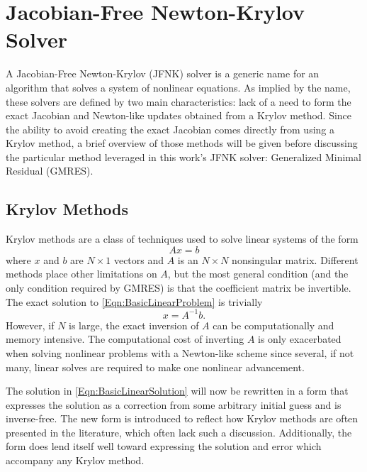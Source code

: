 \documentclass[Prelim,12pt]{WisconsinThesis}
\newcommand{\by}    {\!\times\!}
\begin{document}
\chapter[JFNK Solver]{Jacobian-Free Newton-Krylov Solver}

A Jacobian-Free Newton-Krylov (JFNK) solver is a generic name for an algorithm that solves a system of nonlinear equations.
As implied by the name, these solvers are defined by two main characteristics: lack of a need to form the exact Jacobian and Newton-like updates obtained from a Krylov method.
Since the ability to avoid creating the exact Jacobian comes directly from using a Krylov method, a brief overview of those methods will be given before discussing the particular method leveraged in this work's JFNK solver: Generalized Minimal Residual (GMRES).



\section{Krylov Methods}
Krylov methods are a class of techniques used to solve linear systems of the form
\begin{equation}
    A x = b
    \label{Eqn:BasicLinearProblem}
\end{equation}
where $x$ and $b$ are $N \by 1$ vectors and $A$ is an $N \by N$ nonsingular matrix.
Different methods place other limitations on $A$, but the most general condition (and the only condition required by GMRES) is that the coefficient matrix be invertible.
The exact solution to \cref{Eqn:BasicLinearProblem} is trivially
\begin{equation}
    x = A^{-1} b.
    \label{Eqn:BasicLinearSolution}
\end{equation}
However, if $N$ is large, the exact inversion of $A$ can be computationally and memory intensive.
The computational cost of inverting $A$ is only exacerbated when solving nonlinear problems with a Newton-like scheme since several, if not many, linear solves are required to make one nonlinear advancement.



The solution in \cref{Eqn:BasicLinearSolution} will now be rewritten in a form that expresses the solution as a correction from some arbitrary initial guess and is inverse-free.
The new form is introduced to reflect how Krylov methods are often presented in the literature, which often lack such a discussion.
Additionally, the form does lend itself well toward expressing the solution and error which accompany any Krylov method.
\end{document}
